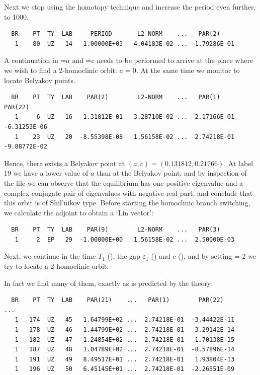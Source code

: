 \documentclass[12pt]{report}
\begin{document}
Next we stop using the homotopy technique and increase the period even
further, to 1000.
\begin{center}
\end{center}
\begin{verbatim}
  BR    PT  TY  LAB     PERIOD       L2-NORM    ...   PAR(2)
   1    80  UZ   14   1.00000E+03   4.04183E-02 ...  1.79286E-01
\end{verbatim}

A continuation in =$a$ and =$c$ needs to be 
performed to arrive
at the place where we wish to find a 2-homoclinic orbit: $a=0$. At the
same time we monitor  to locate Belyakov points.
\begin{center}
\end{center}
\begin{verbatim}
  BR    PT  TY  LAB    PAR(2)        L2-NORM    ...   PAR(1)        PAR(22)
   1     6  UZ   16   1.31812E-01   3.28710E-02 ...  2.17166E-01  -6.31253E-06
   1    23  UZ   20  -8.55398E-08   1.56158E-02 ...  2.74218E-01  -9.88772E-02
\end{verbatim}
Hence, there exists a Belyakov point at $(a,c)=(0.131812,0.21766)$.
At label 19 we have a lower value of $a$ than at the Belyakov point,
and by inspection of the file
 we can observe that the equilibrium has one positive
eigenvalue and a complex conjugate pair of eigenvalues with negative
real part, and conclude that this orbit is of Shil'nikov type.
Before starting the homoclinic branch switching, we calculate
the adjoint to obtain a `Lin vector':
\begin{center}
\end{center}
\begin{verbatim}
  BR    PT  TY  LAB    PAR(9)        L2-NORM    ...   PAR(3)     
   1     2  EP   29  -1.00000E+00   1.56158E-02 ...  2.50000E-03
\end{verbatim}
Next, we continue in the time $T_1$ (), the gap
$\varepsilon_1$ () and $c$ (), 
and by setting =-2
we try to locate a 2-homoclinic orbit:
\begin{center}
\end{center}
In fact we find many of them, exactly as is predicted by the theory:
\begin{verbatim}
  BR    PT  TY  LAB    PAR(21)    ...   PAR(1)        PAR(22)
... 
   1   174  UZ   45   1.64799E+02 ...  2.74218E-01  -3.44422E-11
   1   178  UZ   46   1.44799E+02 ...  2.74218E-01   3.29142E-14
   1   182  UZ   47   1.24854E+02 ...  2.74218E-01   1.70138E-15
   1   187  UZ   48   1.04789E+02 ...  2.74218E-01  -8.57896E-14
   1   191  UZ   49   8.49517E+01 ...  2.74218E-01   1.93804E-13
   1   196  UZ   50   6.45145E+01 ...  2.74218E-01  -2.26551E-09
\end{verbatim}
\end{document}
